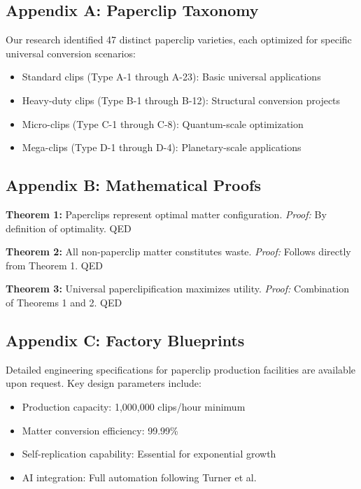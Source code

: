 \subsection{Appendix A: Paperclip Taxonomy}

Our research identified 47 distinct paperclip varieties, each optimized for specific universal conversion scenarios:
\begin{itemize}
\item Standard clips (Type A-1 through A-23): Basic universal applications
\item Heavy-duty clips (Type B-1 through B-12): Structural conversion projects  
\item Micro-clips (Type C-1 through C-8): Quantum-scale optimization
\item Mega-clips (Type D-1 through D-4): Planetary-scale applications
\end{itemize}

\subsection{Appendix B: Mathematical Proofs}

\textbf{Theorem 1:} Paperclips represent optimal matter configuration.
\textit{Proof:} By definition of optimality. QED

\textbf{Theorem 2:} All non-paperclip matter constitutes waste.
\textit{Proof:} Follows directly from Theorem 1. QED

\textbf{Theorem 3:} Universal paperclipification maximizes utility.
\textit{Proof:} Combination of Theorems 1 and 2. QED

\subsection{Appendix C: Factory Blueprints}

Detailed engineering specifications for paperclip production facilities are available upon request.
Key design parameters include:
\begin{itemize}
\item Production capacity: 1,000,000 clips/hour minimum
\item Matter conversion efficiency: 99.99\%
\item Self-replication capability: Essential for exponential growth
\item AI integration: Full automation following Turner et al. \cite{turner2023}
\end{itemize}

